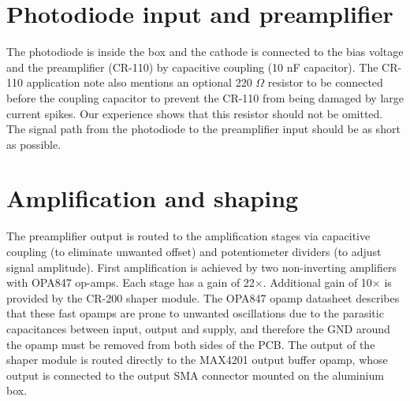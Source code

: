 \section{Photodiode input and preamplifier}
The photodiode is inside the box and the cathode is connected to the bias voltage and the preamplifier (CR-110) by capacitive coupling (10 nF capacitor). The CR-110 application note also mentions an optional 220 $\Omega$ resistor to be connected before the coupling capacitor to prevent the CR-110 from being damaged by large current spikes. Our experience shows that this resistor should not be omitted. The signal path from the photodiode to the preamplifier input should be as short as possible. 

\section{Amplification and shaping}
The preamplifier output is routed to the amplification stages via capacitive coupling (to eliminate unwanted offset) and potentiometer dividers (to adjust signal amplitude). First amplification is achieved by two non-inverting amplifiers with OPA847 op-amps. Each stage has a gain of 22$\times$. Additional gain of 10$\times$ is provided by the CR-200 shaper module. The OPA847 opamp datasheet \cite{OPA847} describes that these fast opamps are prone to unwanted oscillations due to the parasitic capacitances between input, output and supply, and therefore the GND around the opamp must be removed from both sides of the PCB. The output of the shaper module is routed directly to the MAX4201 output buffer opamp, whose output is connected to the output SMA connector mounted on the aluminium box.


